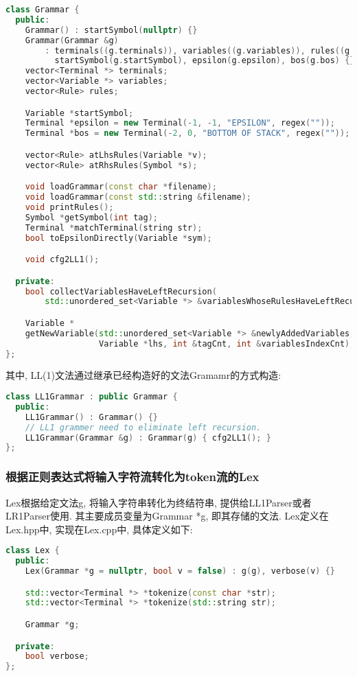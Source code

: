 \begin{lstlisting}[language=c++]
class Grammar {
  public:
    Grammar() : startSymbol(nullptr) {}
    Grammar(Grammar &g)
        : terminals((g.terminals)), variables((g.variables)), rules((g.rules)),
          startSymbol(g.startSymbol), epsilon(g.epsilon), bos(g.bos) {}
    vector<Terminal *> terminals;
    vector<Variable *> variables;
    vector<Rule> rules;

    Variable *startSymbol;
    Terminal *epsilon = new Terminal(-1, -1, "EPSILON", regex(""));
    Terminal *bos = new Terminal(-2, 0, "BOTTOM OF STACK", regex(""));

    vector<Rule> atLhsRules(Variable *v);
    vector<Rule> atRhsRules(Symbol *s);

    void loadGrammar(const char *filename);
    void loadGrammar(const std::string &filename);
    void printRules();
    Symbol *getSymbol(int tag);
    Terminal *matchTerminal(string str);
    bool toEpsilonDirectly(Variable *sym);

    void cfg2LL1();

  private:
    bool collectVariablesHaveLeftRecursion(
        std::unordered_set<Variable *> &variablesWhoseRulesHaveLeftRecursion);

    Variable *
    getNewVariable(std::unordered_set<Variable *> &newlyAddedVariables,
                   Variable *lhs, int &tagCnt, int &variablesIndexCnt);
};
\end{lstlisting}
其中, LL(1)文法通过继承已经构造好的文法Gramamr的方式构造:
\begin{lstlisting}[language=c++]
class LL1Grammar : public Grammar {
  public:
    LL1Grammar() : Grammar() {}
    // LL1 grammer need to eliminate left recursion.
    LL1Grammar(Grammar &g) : Grammar(g) { cfg2LL1(); }
};
\end{lstlisting}

\subsubsection{根据正则表达式将输入字符流转化为token流的Lex}
Lex根据给定文法g, 将输入字符串转化为终结符串, 提供给LL1Parser或者LR1Parser使用.
其主要成员变量为Grammar *g, 即其存储的文法. Lex定义在Lex.hpp中, 实现在Lex.cpp中,
具体定义如下:
\begin{lstlisting}[language=c++]
class Lex {
  public:
    Lex(Grammar *g = nullptr, bool v = false) : g(g), verbose(v) {}

    std::vector<Terminal *> *tokenize(const char *str);
    std::vector<Terminal *> *tokenize(std::string str);

    Grammar *g;

  private:
    bool verbose;
};
\end{lstlisting}

